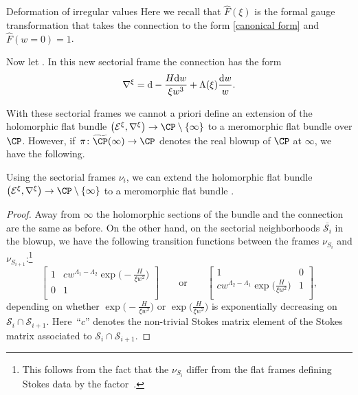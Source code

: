 \begin{subsubsection}{Deformation of irregular values}
Here we recall that $\widehat{F}(\xi)$ is the formal gauge transformation that takes the connection to the form \eqref{canonical form} and $\widehat{F}(w=0)=1$.

Now let . In this new sectorial frame the connection has the form
\begin{equation*}
 \nabla^{\xi}={\rm d}-\frac{H{\rm d}w}{\xi w^3}+\Lambda(\xi)\frac{{\rm d}w}{w}.
\end{equation*}

With these sectorial frames we cannot a priori define an extension of the holomorphic flat bundle $\bigl(\mathcal{E}^{\xi},\nabla^{\xi}\bigr)\to \CP \setminus \{\infty\}$ to a meromorphic flat bundle over $\CP$. However, if~$\smash{\pi\colon\widetilde{\CP}(\infty)}\to \CP$ denotes the real blowup of $\CP$ at $\infty$, we have the following.

\begin{Proposition} Using the sectorial frames $\nu_i$, we can extend the holomorphic flat bundle~${\bigl(\mathcal{E}^{\xi},\nabla^{\xi}\bigr)\to \CP \setminus \{\infty\}}$ to a meromorphic flat bundle .

\begin{proof}
Away from $\infty$ the holomorphic sections of the bundle and the connection are the same as before. On the other hand, on the sectorial neighborhoods $\overline{\mathcal{S}_i}$ in the blowup, we have the following transition functions between the frames $\nu_{S_i}$ and $\nu_{S_{i+1}}$:\footnote{This follows from the fact that the $\nu_{S_i}$ differ from the flat frames defining Stokes data by the factor~.}
\begin{equation*}
 \begin{bmatrix}
 1 & cw^{\Lambda_1-\Lambda_2}\exp \bigl(-\frac{H}{\xi w^2}\bigr)\\
 0 & 1\\
 \end{bmatrix}
\qquad \text{or}\qquad
 \begin{bmatrix}
 1 & 0\\
 cw^{\Lambda_2-\Lambda_1}\exp \bigl(\frac{H}{\xi w^2}\bigr) & 1\\
 \end{bmatrix},
\end{equation*}
depending on whether $\exp \bigl(-\frac{H}{\xi w^2}\bigr)$ or $\exp \bigl(\frac{H}{\xi w^2}\bigr)$ is exponentially decreasing on $\mathcal{S}_i\cap \mathcal{S}_{i+1}$. Here~``$c$'' denotes the non-trivial Stokes matrix element of the Stokes matrix associated to $\mathcal{S}_i\cap \mathcal{S}_{i+1}$.


\end{proof}
\end{Proposition}
\end{subsubsection}
